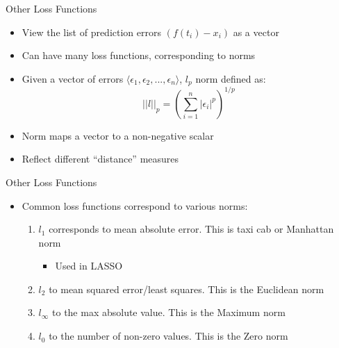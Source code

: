 \documentclass[aspectratio=169]{beamer}
\begin{document}
\begin{frame}{Other Loss Functions}

\begin{itemize}

\item View the list of prediction errors $\left(f(t_i) - x_i \right)$ as a vector
\item Can have many loss functions, corresponding to norms
\item Given a vector of errors $\langle \epsilon_1, \epsilon_2, ..., \epsilon_n \rangle$,
$l_p$ norm defined as:
$$||l||_p = \left(\sum_{i = 1}^n |\epsilon_i|^p \right)^{1/p}$$
\item Norm maps a vector to a non-negative scalar
\item Reflect different ``distance'' measures
\end{itemize}
\end{frame}
\begin{frame}{Other Loss Functions}

\begin{itemize}
\item Common loss functions correspond to various norms:
\begin{enumerate}
	\item $l_1$ corresponds to mean absolute error. This is taxi cab or Manhattan norm
	\begin{itemize}
	\item Used in LASSO
	\end{itemize}

	\item $l_2$ to mean squared error/least squares. This is the Euclidean norm
	\item $l_{\infty}$ to the max absolute value. This is the Maximum norm
	\item $l_0$ to the number of non-zero values. This is the Zero norm
\end{enumerate}
\end{itemize}
\end{frame}
\end{document}

